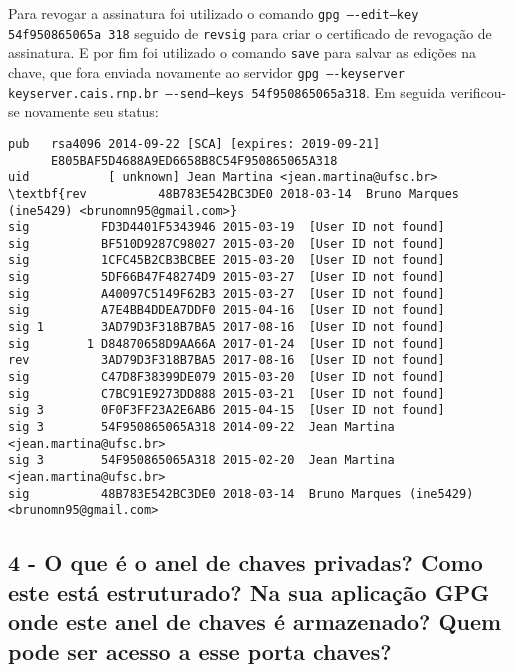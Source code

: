 \documentclass[
    article,            %
    11pt,               %
    oneside,            %
    a4paper,            %
    english,            %
    brazil,             %
    sumario=tradicional,
    ]{abntex2}
\begin{document}
Para revogar a assinatura foi utilizado o comando \texttt{gpg ----edit--key 54f950865065a
318} seguido de \texttt{revsig} para criar o certificado de revogação de assinatura. E por fim foi utilizado o comando \texttt{save} para salvar as edições na chave, que fora enviada novamente ao servidor \texttt{gpg ----keyserver keyserver.cais.rnp.br ----send--keys 54f950865065a318}. Em seguida verificou-se novamente seu status:

\begin{Verbatim}[frame=single, commandchars=\\\{\}, fontsize=\footnotesize]
pub   rsa4096 2014-09-22 [SCA] [expires: 2019-09-21]
      E805BAF5D4688A9ED6658B8C54F950865065A318
uid           [ unknown] Jean Martina <jean.martina@ufsc.br>
\textbf{rev          48B783E542BC3DE0 2018-03-14  Bruno Marques (ine5429) <brunomn95@gmail.com>}
sig          FD3D4401F5343946 2015-03-19  [User ID not found]
sig          BF510D9287C98027 2015-03-20  [User ID not found]
sig          1CFC45B2CB3BCBEE 2015-03-20  [User ID not found]
sig          5DF66B47F48274D9 2015-03-27  [User ID not found]
sig          A40097C5149F62B3 2015-03-27  [User ID not found]
sig          A7E4BB4DDEA7DDF0 2015-04-16  [User ID not found]
sig 1        3AD79D3F318B7BA5 2017-08-16  [User ID not found]
sig        1 D84870658D9AA66A 2017-01-24  [User ID not found]
rev          3AD79D3F318B7BA5 2017-08-16  [User ID not found]
sig          C47D8F38399DE079 2015-03-20  [User ID not found]
sig          C7BC91E9273DD888 2015-03-21  [User ID not found]
sig 3        0F0F3FF23A2E6AB6 2015-04-15  [User ID not found]
sig 3        54F950865065A318 2014-09-22  Jean Martina <jean.martina@ufsc.br>
sig 3        54F950865065A318 2015-02-20  Jean Martina <jean.martina@ufsc.br>
sig          48B783E542BC3DE0 2018-03-14  Bruno Marques (ine5429) <brunomn95@gmail.com>
\end{Verbatim}



\subsection*{\textbf{4 - O que é o anel de chaves privadas? Como este está estruturado? Na sua aplicação GPG onde este anel de chaves é armazenado? Quem pode ser acesso a esse porta chaves?}}
\end{document}
